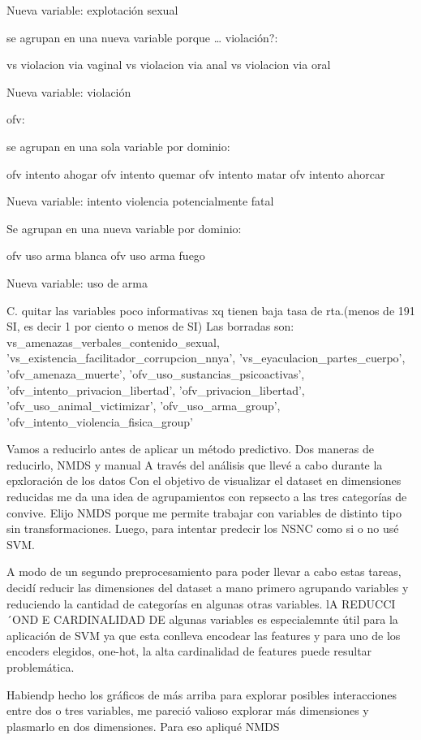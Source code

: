 \documentclass[10 pt]{article}
\begin{document}
Nueva variable: explotación sexual

se agrupan en una nueva variable porque … violación?:

vs violacion via vaginal
vs violacion via anal
vs violacion via oral

Nueva variable: violación

ofv:

se agrupan en una sola variable por dominio:

ofv intento ahogar
ofv intento quemar 
ofv intento matar
ofv intento ahorcar

Nueva variable: intento violencia potencialmente fatal


Se agrupan en una nueva variable por dominio:

ofv uso arma blanca
ofv uso arma fuego

Nueva variable: uso de arma


C. quitar las variables poco informativas xq tienen baja tasa de rta.(menos de 191 SI, es decir 1 por ciento o menos de SI)
Las borradas son: vs_amenazas_verbales_contenido_sexual, 'vs_existencia_facilitador_corrupcion_nnya', 'vs_eyaculacion_partes_cuerpo', 'ofv_amenaza_muerte', 'ofv_uso_sustancias_psicoactivas', 'ofv_intento_privacion_libertad', 'ofv_privacion_libertad', 'ofv_uso_animal_victimizar', 'ofv_uso_arma_group', 'ofv_intento_violencia_fisica_group'



Vamos a reducirlo antes de aplicar un método predictivo. Dos maneras de reducirlo, NMDS y manual
A través del análisis que llevé a cabo durante la epxloración de los datos Con el objetivo de visualizar el dataset en dimensiones reducidas me da una
idea de agrupamientos con repsecto a las tres categorías de convive. Elijo NMDS porque me permite trabajar con
variables de distinto tipo sin transformaciones.
 Luego, para intentar predecir los NSNC como si o no usé SVM. 

A modo de un segundo preprocesamiento para poder llevar a cabo estas tareas, decidí reducir las dimensiones del dataset a mano primero agrupando variables y reduciendo la cantidad de categorías en algunas otras variables. lA REDUCCI´OND E CARDINALIDAD DE algunas variables es especialemnte útil para la aplicación de SVM ya que esta conlleva encodear las features y para uno de los encoders elegidos, one-hot, la alta cardinalidad de features puede resultar problemática.


Habiendp hecho los gráficos de más arriba para explorar posibles interacciones entre dos o tres variables, me pareció valioso explorar más dimensiones y plasmarlo en dos dimensiones. Para eso apliqué NMDS
\end{document}

